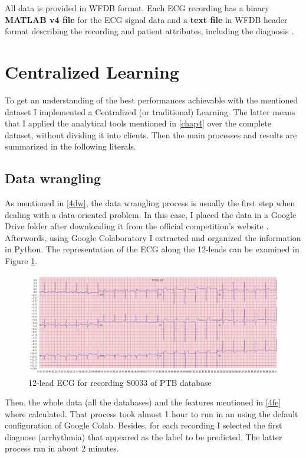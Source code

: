 All data is provided in WFDB format. Each ECG recording has a binary \textbf{MATLAB v4 file} for the ECG signal data and a \textbf{text file} in WFDB header format describing the recording and patient attributes, including the diagnosis \cite{dataset3} \cite{dataset2} \cite{dataset4}.

\section{Centralized Learning} \label{5CL}

To get an understanding of the best performances achievable with the mentioned dataset I implemented a Centralized (or traditional) Learning. The latter means that I applied the analytical tools mentioned in \ref{chap4} over the complete dataset, without dividing it into clients. Then the main processes and results are summarized in the following literals.

\subsection{Data wrangling}

As mentioned in \ref{4dw}, the data wrangling process is usually the first step when dealing with a data-oriented problem. In this case, I placed the data in a Google Drive folder after downloading it from the official competition's website \cite{dataset3}. Afterwords, using Google Colaboratory I extracted and organized the information in Python. The representation of the ECG along the 12-leads can be examined in Figure \ref{fig:ecg_example_S0033}.

\begin{figure}[H]
\centering
\includegraphics[scale=0.35]{img/ecg_example_S0033.png}
\caption{12-lead ECG for recording S0033 of PTB database}
\label{fig:ecg_example_S0033}
\end{figure}

Then, the whole data (all the databases) and the features mentioned in \ref{4fe} where calculated. That process took almost 1 hour to run in an using the default configuration of Google Colab. Besides, for each recording I selected the first diagnose (arrhythmia) that appeared as the label to be predicted. The latter process ran in about 2 minutes.


